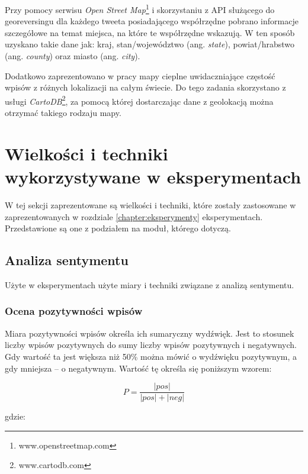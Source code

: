 Przy pomocy serwisu \textit{Open Street Map}\footnote{www.openstreetmap.com} i
skorzystaniu z API służącego do georeversingu dla każdego tweeta posiadającego
współrzędne pobrano informacje szczegółowe na temat miejsca, na które te
współrzędne wskazują. W ten sposób uzyskano takie dane jak: kraj,
stan/województwo (ang. \textit{state}), powiat/hrabstwo (ang. \textit{county})
oraz miasto (ang. \textit{city}).

Dodatkowo zaprezentowano w pracy mapy cieplne uwidaczniające częstość wpisów z
różnych lokalizacji na całym świecie. Do tego zadania skorzystano z usługi
\textit{CartoDB}\footnote{www.cartodb.com}, za pomocą której dostarczając dane
z geolokacją można otrzymać takiego rodzaju mapy.




\section{Wielkości i techniki wykorzystywane w eksperymentach}
\label{section:wielkosciwykorzystywane}
W tej sekcji zaprezentowane są wielkości i techniki, które zostały zastosowane w
zaprezentowanych w rozdziale \ref{chapter:eksperymenty} eksperymentach.
Przedstawione są one z podziałem na moduł, którego dotyczą.

\subsection{Analiza sentymentu}
Użyte w eksperymentach użyte miary i techniki związane z analizą sentymentu.

\subsubsection{Ocena pozytywności wpisów}
\label{subsection:ocenapozytywnosci}
Miara pozytywności wpisów określa ich sumaryczny wydźwięk. Jest to stosunek
liczby wpisów pozytywnych do sumy liczby wpisów pozytywnych i negatywnych. Gdy
wartość ta jest większa niż 50\% można mówić o wydźwięku pozytywnym, a gdy
mniejsza -- o negatywnym. Wartość tę określa się poniższym wzorem: 

\begin{equation}
\label{equation:pozytywnosc}
P = \frac{|pos|}{|pos| + |neg|}
\end{equation}

gdzie:

